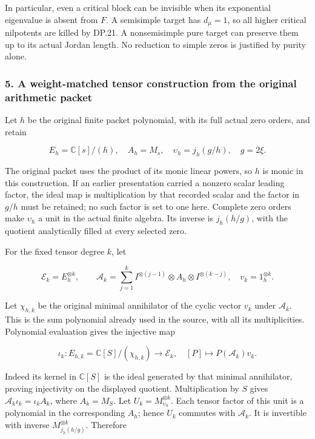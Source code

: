 In particular, even a critical block can be invisible when its exponential eigenvalue is absent from \(F\). A semisimple target has \(d_\mu=1\), so all higher critical nilpotents are killed by DP.21. A nonsemisimple pure target can preserve them up to its actual Jordan length. No reduction to simple zeros is justified by purity alone.

\subsubsection{5. A weight-matched tensor construction from the original arithmetic packet}\label{endpoint-purity_review--a-weight-matched-tensor-construction-from-the-original-arithmetic-packet}

Let \(h\) be the original finite packet polynomial, with its full actual zero orders, and retain

\[
E_h=\mathbb C[s]/(h),\quad A_h=M_s,\quad
\upsilon_h=j_h(g/h),\quad g=2\xi.
\tag{DP.23}
\]

The original packet uses the product of its monic linear powers, so \(h\) is monic in this construction. If an earlier presentation carried a nonzero scalar leading factor, the ideal map is multiplication by that recorded scalar and the factor in \(g/h\) must be retained; no such factor is set to one here. Complete zero orders make \(\upsilon_h\) a unit in the actual finite algebra. Its inverse is \(j_h(h/g)\), with the quotient analytically filled at every selected zero.

For the fixed tensor degree \(k\), let

\[
\mathcal E_k=E_h^{\otimes k},\qquad
\mathcal A_k=\sum_{j=1}^k
 I^{\otimes(j-1)}\otimes A_h\otimes I^{\otimes(k-j)},
\quad v_k=1_h^{\otimes k}.
\tag{DP.24}
\]

Let \(\chi_{h,k}\) be the original minimal annihilator of the cyclic vector \(v_k\) under \(\mathcal A_k\). This is the sum polynomial already used in the source, with all its multiplicities. Polynomial evaluation gives the injective map

\[
\iota_k:E_{h,k}=\mathbb C[S]/(\chi_{h,k})\longrightarrow\mathcal E_k,
\quad [P]\longmapsto P(\mathcal A_k)v_k.
\tag{DP.25}
\]

Indeed its kernel in \(\mathbb C[S]\) is the ideal generated by that minimal annihilator, proving injectivity on the displayed quotient. Multiplication by \(S\) gives \(\mathcal A_k\iota_k=\iota_k A_k\), where \(A_k=M_S\). Let \(U_k=M_{\upsilon_h}^{\otimes k}\). Each tensor factor of this unit is a polynomial in the corresponding \(A_h\); hence \(U_k\) commutes with \(\mathcal A_k\). It is invertible with inverse \(M_{j_h(h/g)}^{\otimes k}\). Therefore

